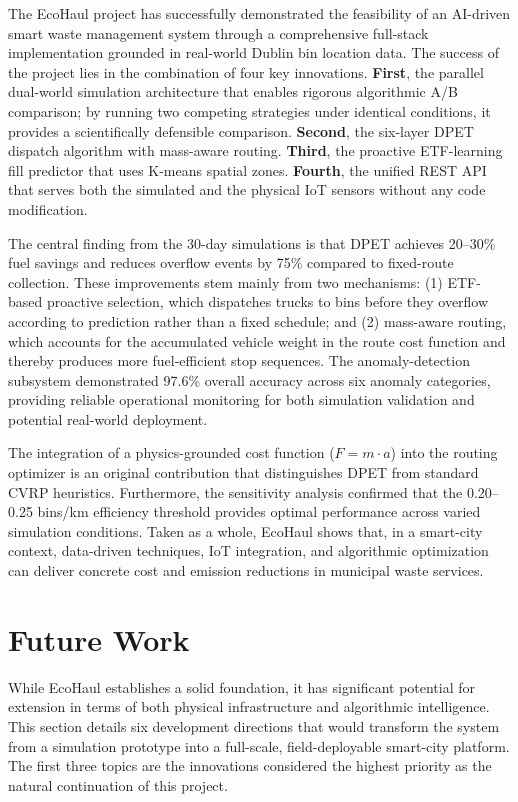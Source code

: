\documentclass[12pt,a4paper]{report}
\begin{document}
\begin{itemize}[leftmargin=*]
\indent The EcoHaul project has successfully demonstrated the feasibility of an AI-driven smart waste management system through a comprehensive full-stack implementation grounded in real-world Dublin bin location data. The success of the project lies in the combination of four key innovations. \textbf{First}, the parallel dual-world simulation architecture that enables rigorous algorithmic A/B comparison; by running two competing strategies under identical conditions, it provides a scientifically defensible comparison. \textbf{Second}, the six-layer DPET dispatch algorithm with mass-aware routing. \textbf{Third}, the proactive ETF-learning fill predictor that uses K-means spatial zones. \textbf{Fourth}, the unified REST API that serves both the simulated and the physical IoT sensors without any code modification.

\indent The central finding from the 30-day simulations is that DPET achieves 20--30\% fuel savings and reduces overflow events by 75\% compared to fixed-route collection. These improvements stem mainly from two mechanisms: (1) ETF-based proactive selection, which dispatches trucks to bins before they overflow according to prediction rather than a fixed schedule; and (2) mass-aware routing, which accounts for the accumulated vehicle weight in the route cost function and thereby produces more fuel-efficient stop sequences. The anomaly-detection subsystem demonstrated 97.6\% overall accuracy across six anomaly categories, providing reliable operational monitoring for both simulation validation and potential real-world deployment.

\indent The integration of a physics-grounded cost function ($F = m \cdot a$) into the routing optimizer is an original contribution that distinguishes DPET from standard CVRP heuristics. Furthermore, the sensitivity analysis confirmed that the 0.20--0.25 bins/km efficiency threshold provides optimal performance across varied simulation conditions. Taken as a whole, EcoHaul shows that, in a smart-city context, data-driven techniques, IoT integration, and algorithmic optimization can deliver concrete cost and emission reductions in municipal waste services.

\section{Future Work}

\indent While EcoHaul establishes a solid foundation, it has significant potential for extension in terms of both physical infrastructure and algorithmic intelligence. This section details six development directions that would transform the system from a simulation prototype into a full-scale, field-deployable smart-city platform. The first three topics are the innovations considered the highest priority as the natural continuation of this project.


\end{itemize}
\end{document}
